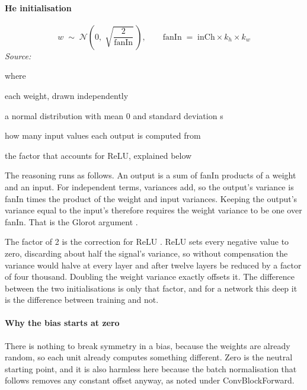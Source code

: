 \paragraph{He initialisation}

\begin{equation}
w \;\sim\; \mathcal{N}\!\left(0,\; \sqrt{\frac{2}{\mathrm{fanIn}}}\,\right), \qquad \mathrm{fanIn} \;=\; \mathrm{inCh} \times k_h \times k_w
\end{equation}
\noindent\emph{Source: }\cite{he2015}


\noindent where
\begin{description}[leftmargin=2.4em,style=nextline,font=\normalfont\ttfamily]\setlength\itemsep{1pt}
  \item[{$w$}] \normalfont each weight, drawn independently
  \item[{$\mathcal{N}(0,s)$}] \normalfont a normal distribution with mean 0 and standard deviation s
  \item[{$\mathrm{fanIn}$}] \normalfont how many input values each output is computed from
  \item[{$2$}] \normalfont the factor that accounts for ReLU, explained below
\end{description}
The reasoning runs as follows. An output is a sum of fanIn products of a weight and an input. For independent terms, variances add, so the output's variance is fanIn times the product of the weight and input variances. Keeping the output's variance equal to the input's therefore requires the weight variance to be one over fanIn. That is the Glorot argument \cite{glorot2010}.

The factor of 2 is the correction for ReLU \cite{he2015}. ReLU sets every negative value to zero, discarding about half the signal's variance, so without compensation the variance would halve at every layer and after twelve layers be reduced by a factor of four thousand. Doubling the weight variance exactly offsets it. The difference between the two initialisations is only that factor, and for a network this deep it is the difference between training and not.


\paragraph{Why the bias starts at zero}
There is nothing to break symmetry in a bias, because the weights are already random, so each unit already computes something different. Zero is the neutral starting point, and it is also harmless here because the batch normalisation that follows removes any constant offset anyway, as noted under ConvBlockForward.



